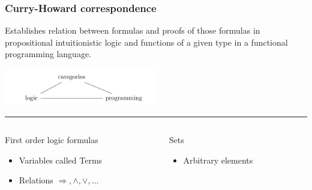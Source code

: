 \documentclass{beamer}
\begin{document}
\begin{frame}
    \frametitle{Curry-Howard correspondence}
    Establishes relation between formulas and proofs of those formulas in
    propositional intuitionistic logic and functions of a given type in a
    functional programming language. \\
    \begin{center}
        \includegraphics[width=0.5\textwidth]{three_way.png}
    \end{center}
    \color{black}\rule{\linewidth}{1pt}
    \begin{columns}[T]
        \begin{column}{.48\textwidth}
            First order logic formulas
            \begin{itemize}
                \item Variables called Terms \\
                \item Relations $\Rightarrow, \wedge, \vee, \dots$  \\
            \end{itemize}
        \end{column}
        \hfill
        \begin{column}{.48\textwidth}
            Sets
            \begin{itemize}
                \item Arbitrary elements
            \end{itemize}
        \end{column}
    \end{columns}
\end{frame}
\end{document}
